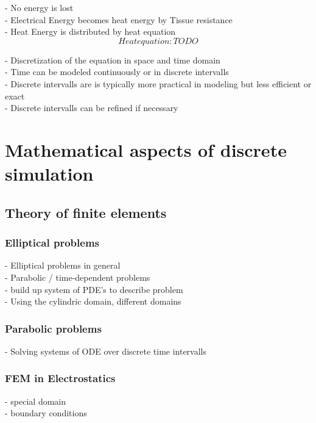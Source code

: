 \documentclass[parskip=half, titlepage=yes, 12pt, BCOR=12mm, DIV=calc]{scrartcl}
\begin{document}
- No energy is lost \\
- Electrical Energy becomes heat energy by Tissue resistance \\
- Heat Energy is distributed by heat equation \\

\begin{equation}
    Heat equation : TODO 
\end{equation}

- Discretization of the equation in space and time domain \\
- Time can be modeled continuously or in discrete intervalls \\
- Discrete intervalls are is typically more practical in modeling but less efficient or exact \\
- Discrete intervalls can be refined if necessary \\

\section{Mathematical aspects of discrete simulation}

\subsection{Theory of finite elements}

\subsubsection{Elliptical problems}
- Elliptical problems in general \\
- Parabolic / time-dependent problems \\
- build up system of PDE's to describe problem \\
- Using the cylindric domain, different domains \\

\subsubsection{Parabolic problems}
- Solving systems of ODE over discrete time intervalls

\subsubsection{FEM in Electrostatics}
- special domain \\
- boundary conditions \\
\end{document}
